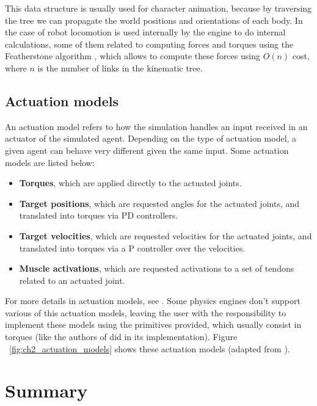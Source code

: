 This data structure is usually used for character animation, because by traversing 
the tree we can propagate the world positions and orientations of each body. In the
case of robot locomotion is used internally by the engine to do internal calculations,
some of them related to computing forces and torques using the Featherstone algorithm \citep{Featherstone},
which allows to compute these forces using $O(n)$ cost, where $n$ is the number of
links in the kinematic tree.

\figKinTreeRepresentation

\subsection{Actuation models}

An actuation model refers to how the simulation handles an input received in an actuator
of the simulated agent. Depending on the type of actuation model, a given agent
can behave very different given the same input. Some actuation models are listed below:

\begin{itemize}
    \item \textbf{Torques}, which are applied directly to the actuated joints.
    \item \textbf{Target positions}, which are requested angles for the actuated joints,
          and translated into torques via PD controllers.
    \item \textbf{Target velocities}, which are requested velocities for the actuated joints,
          and translated into torques via a P controller over the velocities.
    \item \textbf{Muscle activations}, which are requested activations to a set of tendons
          related to an actuated joint.
\end{itemize}

For more details in actuation models, see \cite{ActuationChoice}. Some physics engines don't support 
various of this actuation models, leaving the user with the responsibility to implement
these models using the primitives provided, which usually consist in torques (like the authors
of \citep{DeepmindEmergenceLocomotion} did in its implementation). Figure ~\ref{fig:ch2_actuation_models} 
shows these actuation models (adapted from \cite{ActuationChoice}).

\figActuationModels

\section{Summary}

